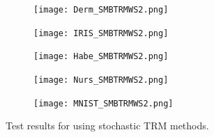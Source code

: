 \documentclass[letterpaper,12pt,titlepage,oneside,final]{book}
\begin{document}
	\begin{figure}
		\centering
		\begin{subfigure}{.45\textwidth}
			\texttt{[image: Derm\_SMBTRMWS2.png]}
		\end{subfigure}
		\begin{subfigure}{.45\textwidth}
			\texttt{[image: IRIS\_SMBTRMWS2.png]}
		\end{subfigure}
		\begin{subfigure}{.45\textwidth}
			\texttt{[image: Habe\_SMBTRMWS2.png]}
		\end{subfigure}
		\begin{subfigure}{.45\textwidth}
			\texttt{[image: Nurs\_SMBTRMWS2.png]}
		\end{subfigure}
		\begin{subfigure}{.45\textwidth}
			\texttt{[image: MNIST\_SMBTRMWS2.png]}
		\end{subfigure}
		\caption{Test results for using stochastic TRM methods.}
		\label{figure:SMBTRMWS}
	\end{figure}
	
\end{document}
